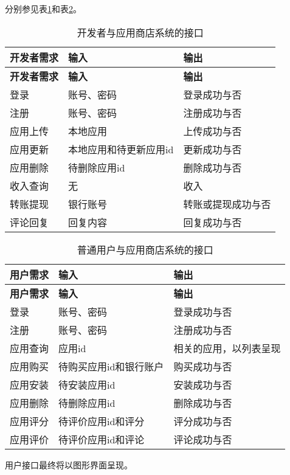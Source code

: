 分别参见表\ref{tab:developer_interface}和表\ref{tab:client_interface}。

\begin{longtable}{|p{4cm}|p{5cm}|p{5cm}|}
	\caption{开发者与应用商店系统的接口}\label{tab:developer_interface} \\
	\hline
	\textbf{开发者需求} & \textbf{输入} & \textbf{输出}\\
	\hline
	\endfirsthead
	\hline
	\textbf{开发者需求} & \textbf{输入} & \textbf{输出}\\
	\hline
	\endhead
	\hline 
	\endfoot
	\hline
	\endlastfoot
	登录 & 账号、密码 & 登录成功与否\\
	注册 & 账号、密码 & 注册成功与否\\
	应用上传 & 本地应用 & 上传成功与否\\
	应用更新 & 本地应用和待更新应用id & 更新成功与否\\
	应用删除 & 待删除应用id & 删除成功与否\\
    收入查询 & 无 & 收入\\
    转账提现 & 银行账号 & 转账或提现成功与否\\
	评论回复 & 回复内容 & 回复成功与否\\
	\end{longtable}

\begin{longtable}{|p{4cm}|p{5cm}|p{5cm}|}
	\caption{普通用户与应用商店系统的接口}\label{tab:client_interface} \\
	\hline
	\textbf{用户需求} & \textbf{输入} & \textbf{输出}\\
	\hline
	\endfirsthead
	\hline
	\textbf{用户需求} & \textbf{输入} & \textbf{输出}\\
	\hline
	\endhead
	\hline 
	\endfoot
	\hline
	\endlastfoot
	登录 & 账号、密码 & 登录成功与否\\
	注册 & 账号、密码 & 注册成功与否\\
	应用查询 & 应用id & 相关的应用，以列表呈现\\
	应用购买 & 待购买应用id和银行账户 & 购买成功与否\\
	应用安装 & 待安装应用id & 安装成功与否\\
    应用删除 & 待删除应用id & 删除成功与否\\
	应用评分 & 待评价应用id和评分 & 评分成功与否\\
	应用评价 & 待评价应用id和评论 & 评论成功与否\\
	\end{longtable}

用户接口最终将以图形界面呈现。


